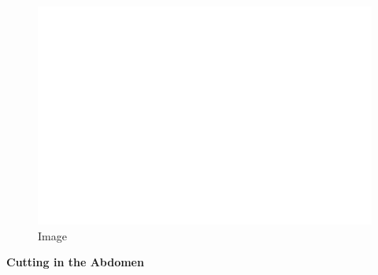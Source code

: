 \begin{figure}
\centering
\includegraphics{./images/combat04.svg}
\caption{Image}
\end{figure}

\textbf{Cutting in the Abdomen}

